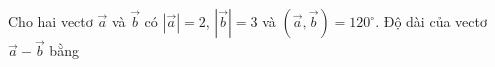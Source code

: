 \begin{ex}
Cho hai vectơ $\vec a$ và $\vec b$ có $|\vec a|=2$, $|\vec b|=3$ và $\left(\vec a,\vec b\right)=120^\circ$. Độ dài của vectơ $\vec a-\vec b$ bằng
\end{ex}
